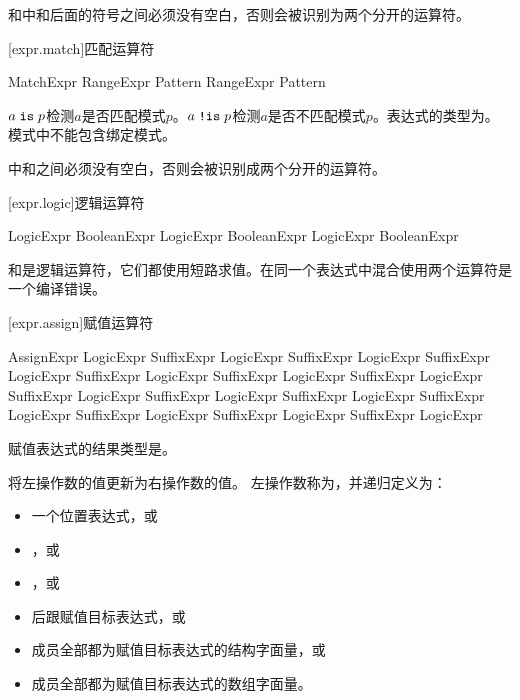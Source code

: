\pnum
\enternote {}和中和后面的符号之间必须没有空白，否则会被识别为两个分开的运算符。\exitnote

[expr.match]{匹配运算符}

\begin{bnf}{MatchExpr}
    RangeExpr  Pattern \br
    RangeExpr  Pattern
\end{bnf}

\pnum
$a \mathrel{\texttt{is}} p$检测$a$是否匹配模式$p$。$a \mathrel{\texttt{!is}} p$检测$a$是否不匹配模式$p$。表达式的类型为。模式中不能包含绑定模式。

\pnum
\enternote {}中\tcode{!}和之间必须没有空白，否则会被识别成两个分开的运算符。\exitnote

[expr.logic]{逻辑运算符}

\begin{bnf}{LogicExpr}
    BooleanExpr \br
    LogicExpr \terminal{\&} BooleanExpr \br
    LogicExpr \terminal{|} BooleanExpr
\end{bnf}

\pnum
\tcode{\&}和\tcode{|}是逻辑运算符，它们都使用短路求值。在同一个表达式中混合使用两个运算符是一个编译错误。

[expr.assign]{赋值运算符}

\begin{bnf}{AssignExpr}
    LogicExpr \br
    SuffixExpr \terminal{=} LogicExpr \br
    SuffixExpr \terminal{+=} LogicExpr \br
    SuffixExpr \terminal{-=} LogicExpr \br
    SuffixExpr \terminal{*=} LogicExpr \br
    SuffixExpr \terminal{/=} LogicExpr \br
    SuffixExpr \terminal{\%=} LogicExpr \br
    SuffixExpr  LogicExpr \br
    SuffixExpr  LogicExpr \br
    SuffixExpr  LogicExpr \br
    SuffixExpr  LogicExpr \br
    SuffixExpr  LogicExpr \br
    SuffixExpr  LogicExpr \br
    SuffixExpr \terminal{\~=} LogicExpr
\end{bnf}

\pnum
赋值表达式的结果类型是。

\pnum
\tcode{=}将左操作数的值更新为右操作数的值。
左操作数称为，并递归定义为：
\begin{itemize}
    \item 一个位置表达式，或
    \item \tcode{_}，或
    \item {}，或
    \item {}后跟赋值目标表达式，或
    \item 成员全部都为赋值目标表达式的结构字面量，或
    \item 成员全部都为赋值目标表达式的数组字面量。
\end{itemize}

